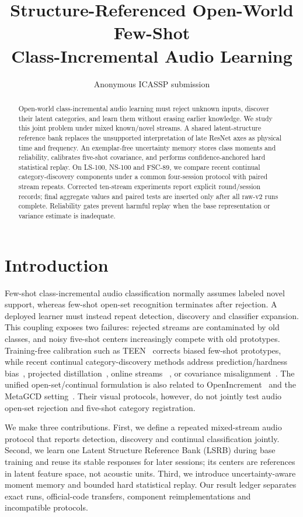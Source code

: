 \documentclass[conference]{IEEEtran}
\title{Structure-Referenced Open-World Few-Shot\\Class-Incremental Audio Learning}
\author{Anonymous ICASSP submission}
\begin{document}
\maketitle
\begin{abstract}
Open-world class-incremental audio learning must reject unknown inputs, discover their
latent categories, and learn them without erasing earlier knowledge. We study this joint
problem under mixed known/novel streams. A shared latent-structure reference bank replaces
the unsupported interpretation of late ResNet axes as physical time and frequency.
An exemplar-free uncertainty memory stores class moments and reliability, calibrates
five-shot covariance, and performs confidence-anchored hard statistical replay. On
LS-100, NS-100 and FSC-89, we compare recent continual category-discovery components
under a common four-session protocol with paired stream repeats. Corrected ten-stream
experiments report explicit round/session records; final aggregate values and paired
tests are inserted only after all raw-v2 runs complete. Reliability gates prevent
harmful replay when the base representation or variance estimate is inadequate.
\end{abstract}

\section{Introduction}
Few-shot class-incremental audio classification normally assumes labeled novel support,
whereas few-shot open-set recognition terminates after rejection. A deployed learner must
instead repeat detection, discovery and classifier expansion. This coupling exposes two
failures: rejected streams are contaminated by old classes, and noisy five-shot centers
increasingly compete with old prototypes.
Training-free calibration such as TEEN~\cite{wang2023teen} corrects biased few-shot
prototypes, while recent continual category-discovery methods address prediction/hardness
bias~\cite{ma2024happy}, projected distillation~\cite{rypesc2024camp}, online streams
~\cite{park2024ocgcd}, or covariance misalignment~\cite{dai2025vbcgcd}. The unified
open-set/continual formulation is also related to OpenIncrement~\cite{xu2023openincrement}
and the MetaGCD setting~\cite{wu2023metagcd}. Their visual protocols, however, do not jointly test
audio open-set rejection and five-shot category registration.

We make three contributions. First, we define a repeated mixed-stream audio protocol that
reports detection, discovery and continual classification jointly. Second, we learn one
Latent Structure Reference Bank (LSRB) during base training and reuse its stable
responses for later sessions; its centers are references in latent feature space, not
acoustic units. Third, we introduce uncertainty-aware moment memory and bounded hard
statistical replay. Our result ledger separates exact runs, official-code transfers,
component reimplementations and incompatible protocols.
\end{document}
